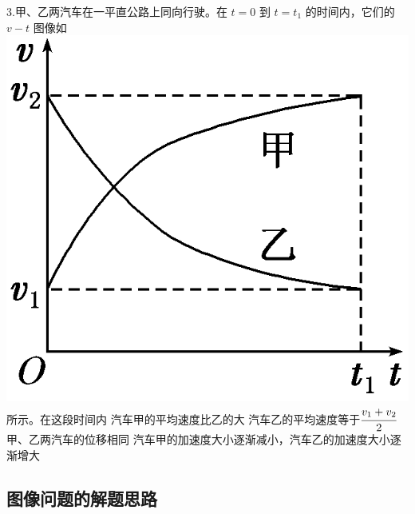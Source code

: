 \documentclass[a4paper,fontset = windows]{ctexbook} %
\begin{document}
\begin{xuanze}
3.甲、乙两汽车在一平直公路上同向行驶。在 $t=0$ 到 $t=t_1$ 的时间内，它们的 $v-t$ 图像如
\includegraphics{../picture/1-3/003.png} 
所示。在这段时间内
\choice[A] 汽车甲的平均速度比乙的大
\choice[B] 汽车乙的平均速度等于$\cfrac{v_1+v_2}{2}$
\choice[C] 甲、乙两汽车的位移相同
\choice[D] 汽车甲的加速度大小逐渐减小，汽车乙的加速度大小逐渐增大

\end{xuanze}

\subsection{图像问题的解题思路}
\end{document}
